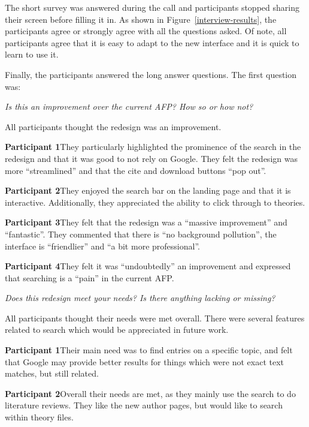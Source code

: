 \documentclass[bsc,frontabs,oneside,singlespacing,parskip,deptreport,logo]{infthesis}
\begin{document}
The short survey was answered during the call and participants stopped sharing their screen before filling it in. As shown in Figure~\ref{interview-results}, the participants agree or strongly agree with all the questions asked. Of note, all participants agree that it is easy to adapt to the new interface and it is quick to learn to use it.

Finally, the participants answered the long answer questions. The first question was:

\begin{center}
    \emph{Is this an improvement over the current AFP? How so or how not?}
\end{center}

All participants thought the redesign was an improvement.

\textbf{Participant 1}\quad They particularly highlighted the prominence of the search in the redesign and that it was good to not rely on Google. They felt the redesign was more ``streamlined'' and that the cite and download buttons ``pop out''.

\textbf{Participant 2}\quad They enjoyed the search bar on the landing page and that it is interactive. Additionally, they appreciated the ability to click through to theories.

\textbf{Participant 3}\quad They felt that the redesign was a ``massive improvement'' and ``fantastic''. They commented that there is ``no background pollution'', the interface is ``friendlier'' and ``a bit more professional''. 

\textbf{Participant 4}\quad They felt it was ``undoubtedly'' an improvement and expressed that searching is a ``pain'' in the current AFP\@.

\begin{center}
    \emph{Does this redesign meet your needs? Is there anything lacking or missing?}
\end{center}

All participants thought their needs were met overall. There were several features related to search which would be appreciated in future work.

\textbf{Participant 1}\quad Their main need was to find entries on a specific topic, and felt that Google may provide better results for things which were not exact text matches, but still related.

\textbf{Participant 2}\quad Overall their needs are met, as they mainly use the search to do literature reviews. They like the new author pages, but would like to search within theory files.
\end{document}
